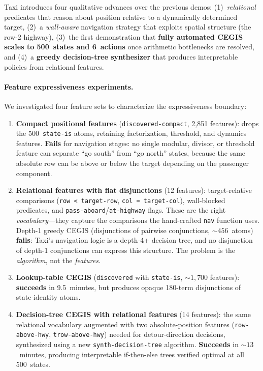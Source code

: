 \noindent Taxi introduces four qualitative advances over the previous demos: (1)~\emph{relational} predicates that reason about position relative to a dynamically determined target, (2)~a \emph{wall-aware} navigation strategy that exploits spatial structure (the row-2 highway), (3)~the first demonstration that \textbf{fully automated CEGIS scales to 500~states and 6~actions} once arithmetic bottlenecks are resolved, and (4)~a \textbf{greedy decision-tree synthesizer} that produces interpretable policies from relational features.

\paragraph{Feature expressiveness experiments.}
We investigated four feature sets to characterize the expressiveness boundary:

\begin{enumerate}
\item \textbf{Compact positional features} (\texttt{discovered-compact}, 2{,}851 features): drops the 500~\texttt{state-is} atoms, retaining factorization, threshold, and dynamics features.  \textbf{Fails} for navigation stages: no single modular, divisor, or threshold feature can separate ``go south'' from ``go north'' states, because the same absolute row can be above or below the target depending on the passenger component.

\item \textbf{Relational features with flat disjunctions} (12 features): target-relative comparisons (\texttt{row~<~target-row}, \texttt{col~=~target-col}), wall-blocked predicates, and \texttt{pass-aboard}/\texttt{at-highway} flags.  These are the right \emph{vocabulary}---they capture the comparisons the hand-crafted \texttt{nav} function uses.  Depth-1 greedy CEGIS (disjunctions of pairwise conjunctions, ${\sim}456$~atoms) \textbf{fails}: Taxi's navigation logic is a depth-4+ decision tree, and no disjunction of depth-1 conjunctions can express this structure.  The problem is the \emph{algorithm}, not the \emph{features}.

\item \textbf{Lookup-table CEGIS} (\texttt{discovered} with \texttt{state-is}, ${\sim}1{,}700$ features): \textbf{succeeds} in 9.5~minutes, but produces opaque 180-term disjunctions of state-identity atoms.

\item \textbf{Decision-tree CEGIS with relational features} (14 features): the same relational vocabulary augmented with two absolute-position features (\texttt{row-above-hwy}, \texttt{trow-above-hwy}) needed for detour-direction decisions, synthesized using a new \texttt{synth-decision-tree} algorithm.  \textbf{Succeeds} in ${\sim}13$~minutes, producing interpretable if-then-else trees verified optimal at all 500~states.
\end{enumerate}

